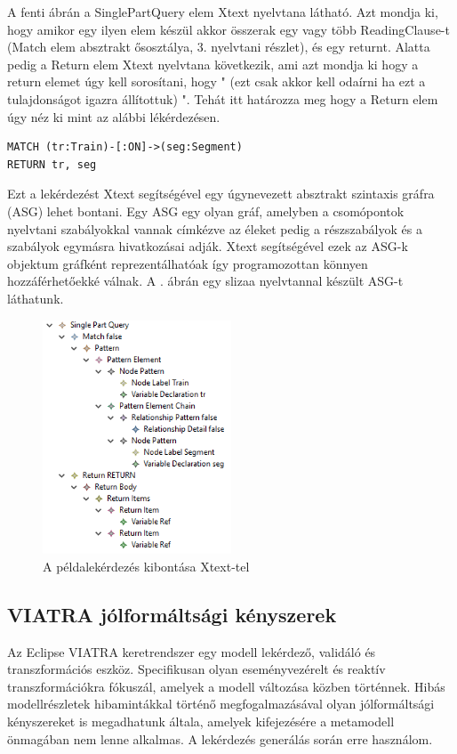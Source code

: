 A fenti ábrán a SinglePartQuery elem Xtext nyelvtana látható. Azt mondja ki,
hogy amikor egy ilyen elem készül akkor összerak egy vagy több ReadingClause-t (Match elem absztrakt ősosztálya, 3. nyelvtani részlet),
és egy returnt. Alatta pedig a Return elem Xtext nyelvtana következik, ami azt mondja ki hogy a return
elemet úgy kell sorosítani, hogy " (ezt csak akkor kell odaírni ha ezt a tulajdonságot igazra
állítottuk) ". Tehát itt határozza meg hogy a Return elem úgy néz ki  mint az alábbi lékérdezésen.

\begin{lstlisting}[style=cyphersmall]
MATCH (tr:Train)-[:ON]->(seg:Segment)
RETURN tr, seg	
\end{lstlisting} 

Ezt a lekérdezést Xtext segítségével egy úgynevezett absztrakt szintaxis gráfra (ASG) lehet bontani. Egy ASG egy olyan gráf, amelyben a csomópontok nyelvtani szabályokkal vannak címkézve az éleket pedig a részszabályok és a szabályok egymásra hivatkozásai adják. Xtext segítségével ezek az ASG-k objektum gráfként reprezentálhatóak így programozottan könnyen hozzáférhetőekké válnak. A .  ábrán egy slizaa nyelvtannal készült ASG-t láthatunk.

\begin{figure}[htp]
	\centering
	\includegraphics[width=0.5\textwidth]{figures/Xtextelkibontotthellowolrd}
	\caption{A példalekérdezés kibontása Xtext-tel}
	\label{fig:Xtexttelkibontotthelloworld}
\end{figure}


\subsection{\textsc{VIATRA} jólformáltsági kényszerek}
Az Eclipse  \textsc{VIATRA} keretrendszer \cite{viatra} egy modell lekérdező, validáló és transzformációs eszköz. Specifikusan olyan eseményvezérelt
és reaktív transzformációkra fókuszál, amelyek a modell változása közben történnek.  Hibás modellrészletek hibamintákkal történő megfogalmazásával olyan jólformáltsági kényszereket is megadhatunk általa, amelyek kifejezésére a metamodell önmagában nem lenne alkalmas. A lekérdezés generálás során erre használom.


